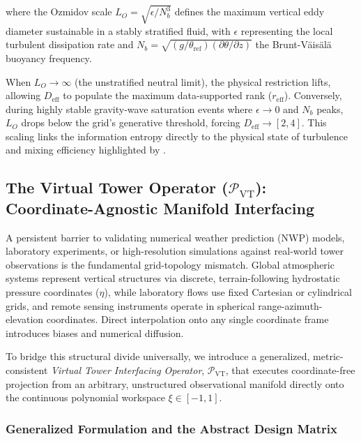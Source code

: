 \documentclass[11pt,a4paper]{article}
\begin{document}
where the Ozmidov scale $L_O = \sqrt{\epsilon / N_b^3}$ defines the maximum vertical eddy diameter sustainable in a stably stratified fluid, with $\epsilon$ representing the local turbulent dissipation rate and $N_b = \sqrt{(g/\theta_{\mathrm{ref}}) (\partial \theta / \partial z)}$ the Brunt-Väisälä buoyancy frequency.

When $L_O \rightarrow \infty$ (the unstratified neutral limit), the physical restriction lifts, allowing $D_{\mathrm{eff}}$ to populate the maximum data-supported rank ($r_{\mathrm{eff}}$). Conversely, during highly stable gravity-wave saturation events where $\epsilon \rightarrow 0$ and $N_b$ peaks, $L_O$ drops below the grid's generative threshold, forcing $D_{\mathrm{eff}} \rightarrow [2, 4]$. This scaling links the information entropy directly to the physical state of turbulence and mixing efficiency highlighted by \citet{Garanaik2019}.

\subsection{The Virtual Tower Operator ($\mathcal{P}_{\mathrm{VT}}$): Coordinate-Agnostic Manifold Interfacing}
\label{sec:extensions:virtual_tower}

A persistent barrier to validating numerical weather prediction (NWP) models, laboratory experiments, or high-resolution simulations against real-world tower observations is the fundamental grid-topology mismatch. Global atmospheric systems represent vertical structures via discrete, terrain-following hydrostatic pressure coordinates ($\eta$), while laboratory flows use fixed Cartesian or cylindrical grids, and remote sensing instruments operate in spherical range-azimuth-elevation coordinates. Direct interpolation onto any single coordinate frame introduces biases and numerical diffusion.

To bridge this structural divide universally, we introduce a generalized, metric-consistent \emph{Virtual Tower Interfacing Operator}, $\mathcal{P}_{\mathrm{VT}}$, that executes coordinate-free projection from an arbitrary, unstructured observational manifold directly onto the continuous polynomial workspace $\xi \in [-1, 1]$.

\subsubsection{Generalized Formulation and the Abstract Design Matrix}
\label{sec:extensions:p_vt_math}
\end{document}
